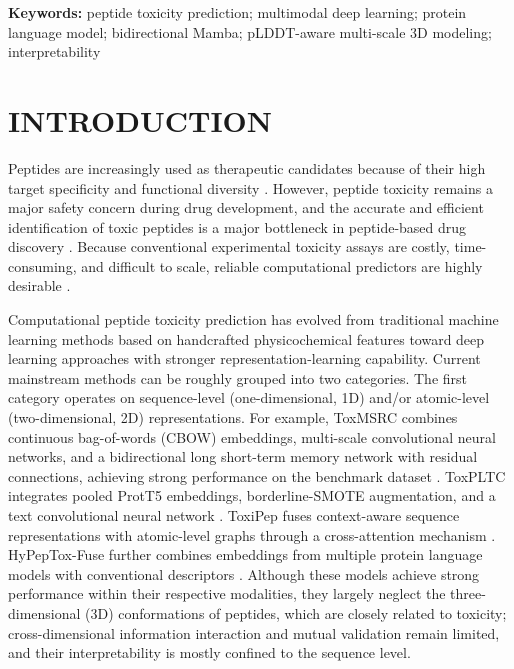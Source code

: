 \documentclass[12pt]{article}
\begin{document}
\noindent\textbf{Keywords:} peptide toxicity prediction; multimodal deep learning; protein language model;
bidirectional Mamba; pLDDT-aware multi-scale 3D modeling; interpretability
\clearpage
\section{INTRODUCTION}

Peptides are increasingly used as therapeutic candidates because of their
high target specificity and functional diversity
\cite{muttenthaler2021}. However, peptide toxicity remains a major safety
concern during drug development, and the accurate and efficient
identification of toxic peptides is a major bottleneck in peptide-based drug
discovery \cite{zhang2025toxmsrc}. Because conventional experimental
toxicity assays are costly, time-consuming, and difficult to scale, reliable
computational predictors are highly desirable \cite{zhang2025toxmsrc}.

Computational peptide toxicity prediction has evolved from traditional machine
learning methods based on handcrafted physicochemical features toward deep
learning approaches with stronger representation-learning capability. Current
mainstream methods can be roughly grouped into two categories. The first
category operates on sequence-level (one-dimensional, 1D) and/or atomic-level
(two-dimensional, 2D) representations. For example, ToxMSRC combines
continuous bag-of-words (CBOW) embeddings, multi-scale convolutional neural
networks, and a bidirectional long short-term memory network with residual
connections, achieving strong performance on the benchmark dataset \cite{zhang2025toxmsrc}.
ToxPLTC integrates pooled ProtT5 embeddings, borderline-SMOTE augmentation,
and a text convolutional neural network \cite{liang2026toxpltc}. ToxiPep fuses context-aware
sequence representations with atomic-level graphs through a cross-attention
mechanism \cite{guan2025toxipep}. HyPepTox-Fuse further combines embeddings from multiple protein
language models with conventional descriptors \cite{tran2025hypeptoxfuse}. Although these models
achieve strong performance within their respective modalities, they largely
neglect the three-dimensional (3D) conformations of peptides, which are
closely related to toxicity; cross-dimensional information interaction and
mutual validation remain limited, and their interpretability is mostly
confined to the sequence level.
\end{document}
